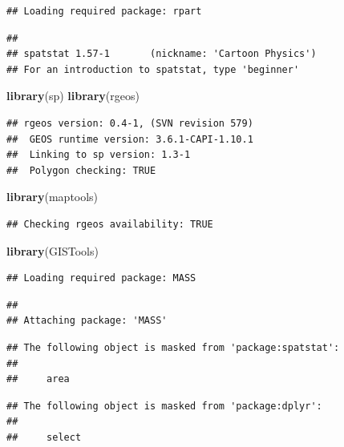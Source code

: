 \documentclass[]{article}
\newenvironment{Shaded}{\begin{snugshade}}{\end{snugshade}}
\newcommand{\KeywordTok}[1]{\textcolor[rgb]{0.13,0.29,0.53}{\textbf{#1}}}
\newcommand{\NormalTok}[1]{#1}
\begin{document}
\begin{verbatim}
## Loading required package: rpart
\end{verbatim}

\begin{verbatim}
## 
## spatstat 1.57-1       (nickname: 'Cartoon Physics') 
## For an introduction to spatstat, type 'beginner'
\end{verbatim}

\begin{Shaded}
\begin{Highlighting}[]
\KeywordTok{library}\NormalTok{(sp)}
\KeywordTok{library}\NormalTok{(rgeos)}
\end{Highlighting}
\end{Shaded}

\begin{verbatim}
## rgeos version: 0.4-1, (SVN revision 579)
##  GEOS runtime version: 3.6.1-CAPI-1.10.1 
##  Linking to sp version: 1.3-1 
##  Polygon checking: TRUE
\end{verbatim}

\begin{Shaded}
\begin{Highlighting}[]
\KeywordTok{library}\NormalTok{(maptools)}
\end{Highlighting}
\end{Shaded}

\begin{verbatim}
## Checking rgeos availability: TRUE
\end{verbatim}

\begin{Shaded}
\begin{Highlighting}[]
\KeywordTok{library}\NormalTok{(GISTools)}
\end{Highlighting}
\end{Shaded}

\begin{verbatim}
## Loading required package: MASS
\end{verbatim}

\begin{verbatim}
## 
## Attaching package: 'MASS'
\end{verbatim}

\begin{verbatim}
## The following object is masked from 'package:spatstat':
## 
##     area
\end{verbatim}

\begin{verbatim}
## The following object is masked from 'package:dplyr':
## 
##     select
\end{verbatim}
\end{document}
